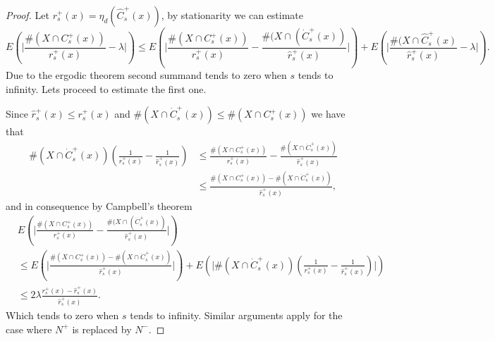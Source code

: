 \begin{proof}
Let $r^+_s(x)=\eta_d(\hat{C}^+_s(x))$,  by stationarity we can estimate\small $$E(\vert\frac{\#(X\cap C^+_s(x))}{r^+_s(x)}-\lambda\vert)\leq E(\vert\frac{\#(X\cap  C^+_s(x))}{r^+_s(x)}-\frac{\#(X\cap(\dot{C}^+_s(x))}{\hat{r}^+_s(x)}\vert)+ E(\vert\frac{\#(X\cap\hat{C}^+_s(x)}{\hat{r}^+_s(x)}-\lambda\vert). $$ \normalsize
Due to the ergodic theorem second summand tends to zero when $s$ tends to infinity. Lets proceed to estimate the first one. 

Since $\hat{r}^+_s(x)\leq r^+_s(x)$ and $\#(X\cap\dot{C}^+_s(x))\leq \#(X\cap C^+_s(x))$ we have that
 \begin{align}
\#(X\cap\dot{C}^+_s(x))(\frac{1}{r^+_s(x)}-\frac{1}{\hat{r}^+_s(x)})&\leq \frac{\#(X\cap C^+_s(x))}{r^+_s(x)}-\frac{\#(X\cap\dot{C}^+_s(x))}{\hat{r}^+_s(x)}\nonumber\\
&\leq \frac{\#(X\cap C^+_s(x))-\#(X\cap\dot{C}^+_s(x))}{\hat{r}^+_s(x)},\nonumber 
\end{align}
and in consequence by Campbell's theorem
\begin{align}
&E(\vert\frac{\#(X\cap  C^+_s(x))}{r^+_s(x)}-\frac{\#(X\cap(\dot{C}^+_s(x))}{\hat{r}^+_s(x)}\vert)\nonumber\\
&\leq E(\vert\frac{\#(X\cap C^+_s(x))-\#(X\cap\dot{C}^+_s(x))}{\hat{r}^+_s(x)}\vert)+E(\vert \#(X\cap\dot{C}^+_s(x))(\frac{1}{r^+_s(x)}-\frac{1}{\hat{r}^+_s(x)})\vert)\nonumber\\
&\leq 2\lambda \frac{r^+_s(x)-\hat{r}_s^+(x)}{\hat{r}^+_s(x)}\nonumber .
\end{align}
Which tends to zero when $s$ tends to infinity. Similar arguments apply for the case where $N^+$ is replaced by $N^-$.
\end{proof}